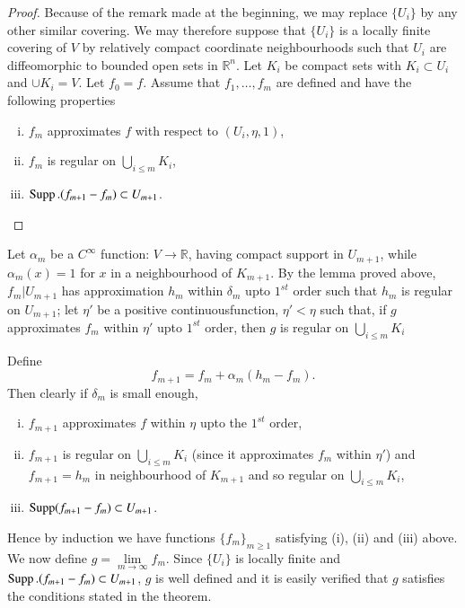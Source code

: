 \begin{proof}
  Because of the remark made at the beginning, we may replace $\{ U_i
  \}$ by any other similar covering. We may therefore suppose that $\{
  U_i \}$ is a locally finite covering of $V$ by relatively compact
  coordinate neighbourhoods such that $U_i$ are diffeomorphic to
  bounded open sets in $\mathbb{R}^n$. Let $K_i$ be compact sets with
  $K_i \subset U_i$ and $\cup K_i=V$. Let $f_0=f$. Assume that $f_1,
  \ldots ,f_m$ are defined and have the following properties 
  \begin{enumerate}[(i)]
  \item $f_m$ approximates $f$ with respect to $(U_i, \eta ,1)$,
  \item $f_m$ is regular on $\bigcup \limits_{i \leq m} K_i$,
  \item $\operatorname{Supp}.(f_{m+1}-f_m)\subset U_{m+1}$.
  \end{enumerate}
\end{proof}

Let $\alpha_m$ be a $C^\infty$ function: $V \to \mathbb{R}$, having
compact support in $U_{m+1}$, while $\alpha_m (x)=1$ for $x$ in a
neighbourhood of $K_{m+1}$. By the lemma proved above, $f_m| U_{m+1}$
has approximation $h_m$ within $\delta_m$ upto $1^{st}$ order such
that $h_m$ is regular on $U_{m 
  +1}$; let $\eta '$ be a positive continuous\pageoriginale function, $\eta' < \eta$
such that, if $g$ approximates $f_m$ within $\eta'$ upto $1^{st}$
order, then $g$ is regular on $\bigcup \limits _{i \leq m} K_i$ 

Define
$$
f_{m+1}=f_m+\alpha_m (h_m-f_m). 
$$
Then clearly if $\delta_m$ is small enough,
\begin{enumerate}[i)]
\item $f_{m+1}$ approximates $f$ within $\eta$ upto the $1^{st}$ order,
\item $f_{m+1}$ is regular on $\bigcup \limits _{i \leq m} K_i$ (since
  it approximates $f_m$ within $\eta'$) and $f_{m+1}=h_{m}$ in
  neighbourhood of $K_{m+1}$ and so regular on $\bigcup \limits _{i
    \leq m} K_i$, 
\item $\operatorname{Supp} (f_{m+1}-f_m) \subset U_{m+1}$.
\end{enumerate}

Hence by induction we have functions $\{ f_m \}_{m \geq 1}$ satisfying
(i), (ii) and (iii) above. We now define $g=\lim \limits_{m \to
  \infty} f_m$. Since $\{ U_i \}$ is locally finite and
$\operatorname{Supp}. (f_{m+1}-f_m)\subset U_{m+1}$, $g$ is well defined and it is
easily verified that $g$ satisfies the conditions stated in the
theorem. 

